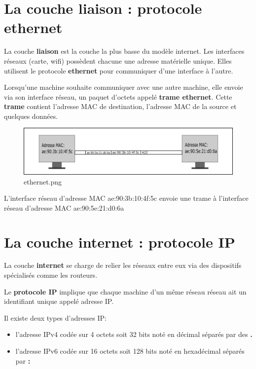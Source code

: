 \documentclass[11pt]{article}
\providecommand{\tightlist}{%
      \setlength{\itemsep}{0pt}\setlength{\parskip}{0pt}}
\begin{document}
    \hypertarget{la-couche-liaison-protocole-ethernet}{%
\section{La couche liaison : protocole
ethernet}\label{la-couche-liaison-protocole-ethernet}}

La couche \textbf{liaison} est la couche la plus basse du modèle
internet. Les interfaces réseaux (carte, wifi) possèdent chacune une
adresse matérielle unique. Elles utilisent le protocole
\textbf{ethernet} pour communiquer d'une interface à l'autre.

Lorsqu'une machine souhaite communiquer avec une autre machine, elle
envoie via son interface réseau, un paquet d'octets appelé \textbf{trame
ethernet}. Cette \textbf{trame} contient l'adresse MAC de destination,
l'adresse MAC de la source et quelques données.

    \begin{figure}
\centering
\includegraphics{img/ethernet.png}
\caption{ethernet.png}
\end{figure}

    L'interface réseau d'adresse MAC ae:90:3b:10:4f:5c envoie une trame à
l'interface réseau d'adresse MAC ae:90:5e:21:d0:6a

    \hypertarget{la-couche-internet-protocole-ip}{%
\section{La couche internet : protocole
IP}\label{la-couche-internet-protocole-ip}}

La couche \textbf{internet} se charge de relier les réseaux entre eux
via des dispositifs spécialisés comme les routeurs.

Le \textbf{protocole IP} implique que chaque machine d'un même réseau
réseau ait un identifiant unique appelé adresse IP.

Il existe deux types d'adresses IP:

\begin{itemize}
\tightlist
\item
  l'adresse IPv4 codée sur 4 octets soit 32 bits noté en décimal séparés
  par des \textbf{.}
\item
  l'adresse IPv6 codée sur 16 octets soit 128 bits noté en hexadécimal
  séparés par \textbf{:}
\end{itemize}
\end{document}
